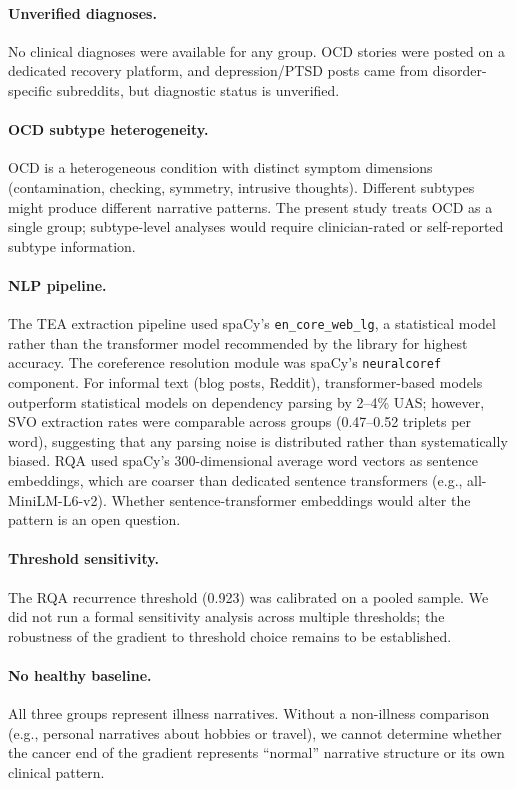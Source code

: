 \documentclass[11pt,a4paper]{article}
\begin{document}
\paragraph{Unverified diagnoses.}
No clinical diagnoses were available for any group. OCD stories were posted on a dedicated recovery platform, and depression/PTSD posts came from disorder-specific subreddits, but diagnostic status is unverified.

\paragraph{OCD subtype heterogeneity.}
OCD is a heterogeneous condition with distinct symptom dimensions (contamination, checking, symmetry, intrusive thoughts). Different subtypes might produce different narrative patterns. The present study treats OCD as a single group; subtype-level analyses would require clinician-rated or self-reported subtype information.

\paragraph{NLP pipeline.}
The TEA extraction pipeline used spaCy's \texttt{en\_core\_web\_lg}, a statistical model rather than the transformer model recommended by the library for highest accuracy. The coreference resolution module was spaCy's \texttt{neuralcoref} component. For informal text (blog posts, Reddit), transformer-based models outperform statistical models on dependency parsing by 2--4\% UAS; however, SVO extraction rates were comparable across groups (0.47--0.52 triplets per word), suggesting that any parsing noise is distributed rather than systematically biased. RQA used spaCy's 300-dimensional average word vectors as sentence embeddings, which are coarser than dedicated sentence transformers (e.g., all-MiniLM-L6-v2). Whether sentence-transformer embeddings would alter the pattern is an open question.

\paragraph{Threshold sensitivity.}
The RQA recurrence threshold (0.923) was calibrated on a pooled sample. We did not run a formal sensitivity analysis across multiple thresholds; the robustness of the gradient to threshold choice remains to be established.

\paragraph{No healthy baseline.}
All three groups represent illness narratives. Without a non-illness comparison (e.g., personal narratives about hobbies or travel), we cannot determine whether the cancer end of the gradient represents ``normal'' narrative structure or its own clinical pattern.
\end{document}
